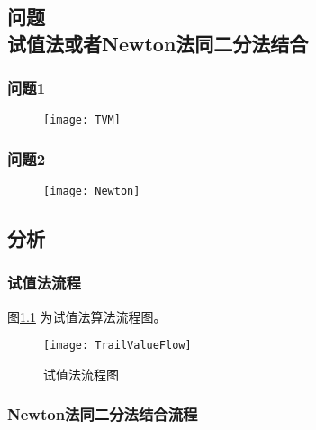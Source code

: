 \chapter[第二章]{} %
\label{cha:chapter2}

\section{问题 \\ 试值法或者Newton法同二分法结合}

\subsection{问题1} %
\label{sub:问题1}

\begin{figure}[ht]
\centering
  \texttt{[image: TVM]}
\end{figure}


\subsection{问题2} %
\label{sub:问题2}

\begin{figure}[ht]
\centering
  \texttt{[image: Newton]}
\end{figure}



\section{分析}

\subsection{试值法流程}

图\ref{fig:TrailValueFlow} 为试值法算法流程图。

\begin{figure}[H]
\centering
  \texttt{[image: TrailValueFlow]}
  \caption{试值法流程图}
  \label{fig:TrailValueFlow}
\end{figure}

\subsection{Newton法同二分法结合流程}

